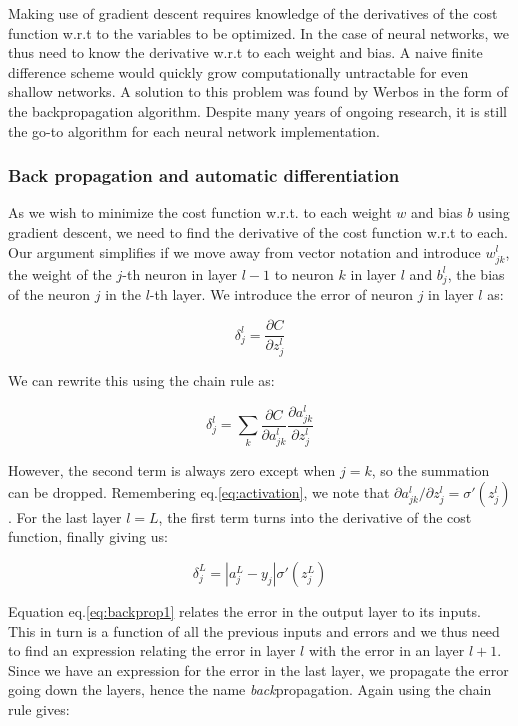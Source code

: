 \documentclass[12pt,a4paper,]{Dissertate}
\begin{document}
Making use of gradient descent requires knowledge of the derivatives of
the cost function w.r.t to the variables to be optimized. In the case of
neural networks, we thus need to know the derivative w.r.t to each
weight and bias. A naive finite difference scheme would quickly grow
computationally untractable for even shallow networks. A solution to
this problem was found by Werbos in the form of the backpropagation
algorithm. Despite many years of ongoing research, it is still the go-to
algorithm for each neural network implementation.

\hypertarget{back-propagation-and-automatic-differentiation}{%
\subsubsection*{Back propagation and automatic
differentiation}\label{back-propagation-and-automatic-differentiation}}

As we wish to minimize the cost function w.r.t. to each weight \(w\) and
bias \(b\) using gradient descent, we need to find the derivative of the
cost function w.r.t to each. Our argument simplifies if we move away
from vector notation and introduce \(w^l_{jk}\), the weight of the
\(j\)-th neuron in layer \(l-1\) to neuron \(k\) in layer \(l\) and
\(b^l_j\), the bias of the neuron \(j\) in the \(l\)-th layer. We
introduce the error of neuron \(j\) in layer \(l\) as:

\[
\delta^l_j=\frac{\partial C}{\partial z^l_j}
\]

We can rewrite this using the chain rule as:

\[
\delta^l_j = \sum_k \frac{\partial C}{\partial a^l_{jk}}\frac{\partial a^l_{jk}}{\partial z^l_{j}} 
\]

However, the second term is always zero except when \(j=k\), so the
summation can be dropped. Remembering eq.\ref{eq:activation}, we note
that \(\partial a^l_{jk}/\partial z^l_{j} = \sigma'(z^l_j)\). For the
last layer \(l = L\), the first term turns into the derivative of the
cost function, finally giving us:

\begin{equation}
\delta^L_j =  |a^L_j-y_j|\sigma'(z^L_j)
\label{eq:backprop1}\end{equation}

Equation eq.\ref{eq:backprop1} relates the error in the output layer to
its inputs. This in turn is a function of all the previous inputs and
errors and we thus need to find an expression relating the error in
layer \(l\) with the error in an layer \(l+1\). Since we have an
expression for the error in the last layer, we propagate the error going
down the layers, hence the name \emph{back}propagation. Again using the
chain rule gives:
\end{document}
